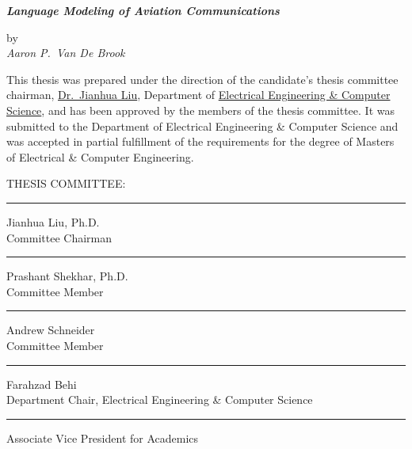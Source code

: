 \documentclass[12pt]{article}
\begin{document}
\begin{center}
    \LARGE
    \textbf{
        \textit{
            Language Modeling of Aviation Communications\\
        }
    }

    \vspace*{0.2in}

    \normalsize
    by\\
    \textit{Aaron P.~Van De Brook}\\

    \vspace*{0.25in}

\end{center}
This thesis was prepared under the direction of the candidate's thesis
committee chairman, \underline{Dr.~Jianhua Liu}, Department of \underline{Electrical Engineering \&
    Computer Science}, and has been approved by the members of the thesis committee.
It was submitted to the Department of Electrical Engineering \& Computer Science
and was accepted in partial fulfillment of the requirements for the degree of
Masters of Electrical \& Computer Engineering.

\begin{center}
    \begin{minipage}{3in}
        \vspace*{0.25in}
        THESIS COMMITTEE:\\
        \vspace*{0.25in}
        \hrule
        \vspace*{2pt}
        Jianhua Liu, Ph.D.\\
        Committee Chairman\\
        \vspace*{0.75in}
        \hrule
        \vspace*{2pt}
        Prashant Shekhar, Ph.D.\\
        Committee Member\\
        \vspace*{0.75in}
        \hrule
        \vspace*{2pt}
        Andrew Schneider\\
        Committee Member\\
        \vspace*{0.75in}
        \hrule
        \vspace*{2pt}
        Farahzad Behi\\
        Department Chair, Electrical Engineering \& Computer Science\\
        \vspace*{0.75in}
        \hrule
        \vspace*{2pt}
        Associate Vice President for Academics
    \end{minipage}
\end{center}
\newpage
\tableofcontents
\newpage
\doublespacing{}
\end{document}
